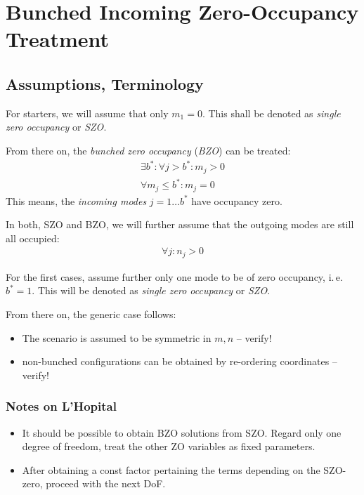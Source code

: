 \documentclass[
	english,
	a4paper,
	fontsize=10pt,
	parskip=half,
	titlepage=true,
	DIV=12,
	final
]{scrreprt}
\title{\myTitle}
\author{\myName}
\date{\today}
\newcommand*{\ie}{i.\,e.\xspace}
\begin{document}
\tableofcontents
\newpage

\chapter{Bunched Incoming Zero-Occupancy Treatment}
\section{Assumptions, Terminology}
For starters, we will assume that only $m_1 = 0$. This shall be denoted as \emph{single zero occupancy} or \emph{SZO}.

From there on, the \emph{bunched zero occupancy} (\emph{BZO}) can be treated:
\begin{align}
	\exists b^{*} : \forall j > b^{*} : m_j > 0 \\
	\forall m_j \leq b^{*} : m_j = 0
\end{align}
This means, the \emph{incoming modes} $j = 1 \ldots b^{*}$ have occupancy zero. 

In both, SZO and BZO, we will further assume that the outgoing modes are still all occupied:
\begin{align}
	\forall j : n_j > 0
\end{align}

For the first cases, assume further only one mode to be of zero occupancy, \ie $b^* = 1$. This will be denoted as \emph{single zero occupancy} or \emph{SZO}.

From there on, the generic case follows:
\begin{itemize}
\item The scenario is assumed to be symmetric in $m, n$ -- verify!
\item non-bunched configurations can be obtained by re-ordering coordinates -- verify!
\end{itemize}

\subsection{Notes on L'Hopital}
\begin{itemize}
\item It should be possible to obtain BZO solutions from SZO. Regard only one degree of freedom, treat the other ZO variables as fixed parameters.
\item After obtaining a const factor pertaining the terms depending on the SZO-zero, proceed with the next DoF.
\end{itemize}
\end{document}
